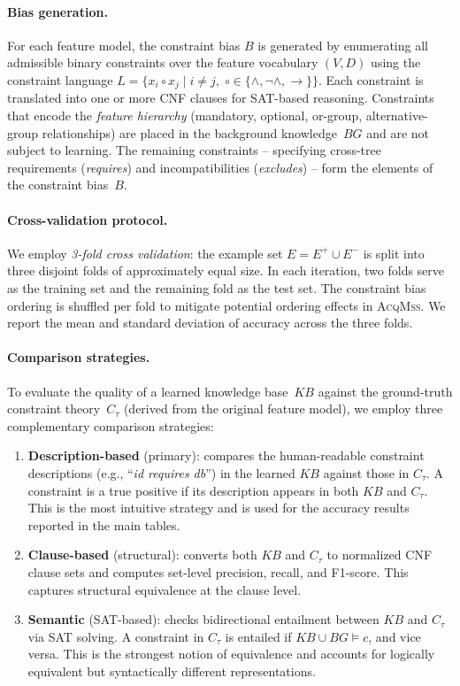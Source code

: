 \paragraph{Bias generation.}
For each feature model, the constraint bias $B$ is generated by enumerating all admissible binary constraints over the feature vocabulary $(V,D)$ using the constraint language $L = \{x_i \circ x_j \mid i \neq j,\; \circ \in \{\wedge, \neg\wedge, \rightarrow\}\}$. Each constraint is translated into one or more CNF clauses for SAT-based reasoning. Constraints that encode the \textit{feature hierarchy} (mandatory, optional, or-group, alternative-group relationships) are placed in the background knowledge~$BG$ and are not subject to learning. The remaining constraints -- specifying cross-tree requirements (\textit{requires}) and incompatibilities (\textit{excludes}) -- form the elements of the constraint bias~$B$.

\paragraph{Cross-validation protocol.}
We employ \textit{3-fold cross validation}: the example set $E = E^+ \cup E^-$ is split into three disjoint folds of approximately equal size. In each iteration, two folds serve as the training set and the remaining fold as the test set. The constraint bias ordering is shuffled per fold to mitigate potential ordering effects in \textsc{AcqMss}. We report the mean and standard deviation of accuracy across the three folds.

\paragraph{Comparison strategies.}
To evaluate the quality of a learned knowledge base~$KB$ against the ground-truth constraint theory~$C_\tau$ (derived from the original feature model), we employ three complementary comparison strategies:
\begin{enumerate}
    \item \textbf{Description-based} (primary): compares the human-readable constraint descriptions (e.g., ``\textit{id requires db}'') in the learned $KB$ against those in $C_\tau$. A constraint is a true positive if its description appears in both $KB$ and $C_\tau$. This is the most intuitive strategy and is used for the accuracy results reported in the main tables.
    \item \textbf{Clause-based} (structural): converts both $KB$ and $C_\tau$ to normalized CNF clause sets and computes set-level precision, recall, and F1-score. This captures structural equivalence at the clause level.
    \item \textbf{Semantic} (SAT-based): checks bidirectional entailment between $KB$ and $C_\tau$ via SAT solving. A constraint in $C_\tau$ is entailed if $KB \cup BG \models c$, and vice versa. This is the strongest notion of equivalence and accounts for logically equivalent but syntactically different representations.
\end{enumerate}

